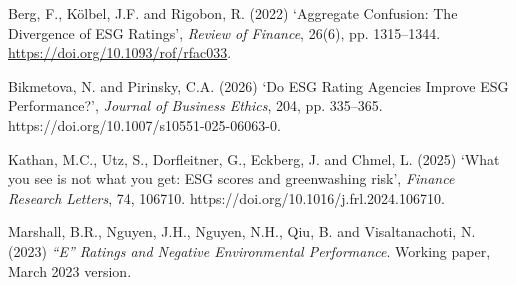 \documentclass[12pt,a4paper]{article}
\begin{document}
Berg, F., Kölbel, J.F. and Rigobon, R. (2022) ‘Aggregate Confusion: The Divergence of ESG Ratings’, \textit{Review of Finance}, 26(6), pp. 1315–1344. \href{https://doi.org/10.1093/rof/rfac033}{https://doi.org/10.1093/rof/rfac033}. 

Bikmetova, N. and Pirinsky, C.A. (2026) ‘Do ESG Rating Agencies Improve ESG Performance?’, \textit{Journal of Business Ethics}, 204, pp. 335–365. https://doi.org/10.1007/s10551-025-06063-0. 

Kathan, M.C., Utz, S., Dorfleitner, G., Eckberg, J. and Chmel, L. (2025) ‘What you see is not what you get: ESG scores and greenwashing risk’, \textit{Finance Research Letters}, 74, 106710. https://doi.org/10.1016/j.frl.2024.106710. 

Marshall, B.R., Nguyen, J.H., Nguyen, N.H., Qiu, B. and Visaltanachoti, N. (2023) \textit{“E” Ratings and Negative Environmental Performance}. Working paper, March 2023 version. 
\end{document}
